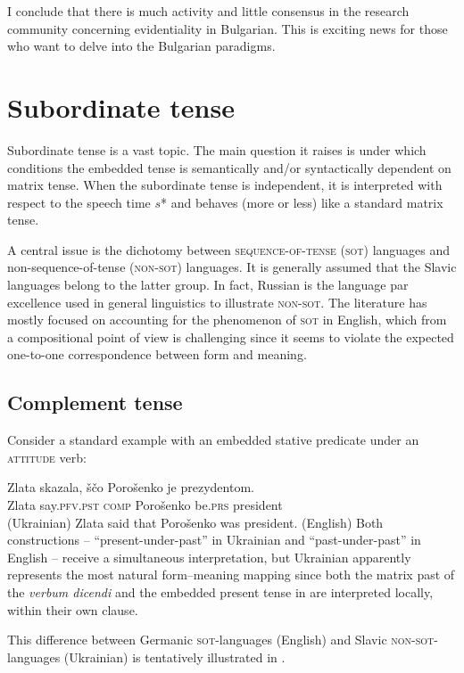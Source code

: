 \documentclass[output=paper,colorlinks,citecolor=brown]{langscibook}
\begin{document}
I conclude that there is much activity and little consensus in the research community concerning evidentiality in Bulgarian. This is exciting news for those who want to delve into the Bulgarian paradigms.


\section{Subordinate tense}\label{sec:4}

Subordinate tense is  a vast topic. The main question it raises is under which conditions the embedded tense is semantically and/or syntactically dependent on matrix tense. When the subordinate tense is independent, it is interpreted with respect to the speech time $s$* and behaves (more or less) like a standard matrix tense.

A central issue is the dichotomy between \textsc{sequence-of-tense} (\textsc{sot}) languages and  non-sequence-of-tense (\textsc{non-sot}) languages. It is generally assumed that the Slavic languages belong to the latter group. In fact, Russian is the language par excellence used in general linguistics to illustrate \textsc{non-sot}. The literature has mostly focused on accounting for the phenomenon of \textsc{sot} in English, which from a compositional point of view is challenging  since it seems to violate the expected one-to-one correspondence between form and meaning.

\subsection{Complement tense}
Consider a standard example with an embedded stative predicate under an \textsc{attitude} verb:

\ea\ea\label{ukr-att}\gll
Zlata skazala, ščo  Porošenko je prezydentom.\\
Zlata say.\textsc{pfv}.\textsc{pst} \textsc{comp} Porošenko be.\textsc{prs} president
 \\\hfill (Ukrainian)
\ex\label{eng-att} Zlata said that Porošenko was president. \hfill (English)
\z\z
Both constructions -- ``present-under-past'' in Ukrainian and ``past-under-past'' in English --  receive a simultaneous interpretation, but Ukrainian  apparently represents the most natural form--meaning mapping since both the matrix past of the \textit{verbum dicendi} and the embedded present tense  in    are interpreted locally, within their own clause.
 
 
This difference between Germanic \textsc{sot}-languages (English) and Slavic \textsc{non-sot}-languages (Ukrainian) is tentatively illustrated in  .    
\end{document}

